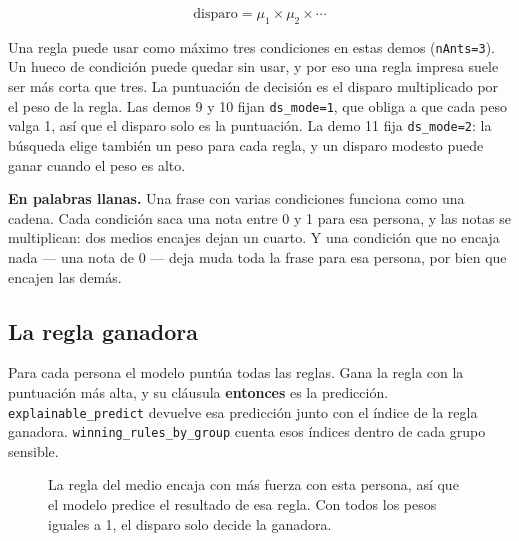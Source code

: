 \documentclass[11pt]{article}
\newcommand{\fn}[1]{\texttt{\small #1}}
\begin{document}
\[
\text{disparo} = \mu_1 \times \mu_2 \times \cdots
\]

Una regla puede usar como máximo tres condiciones en estas demos (\fn{nAnts=3}). Un hueco de condición puede quedar sin usar, y por eso una regla impresa suele ser más corta que tres. La puntuación de decisión es el disparo multiplicado por el peso de la regla. Las demos 9 y 10 fijan \fn{ds\_mode=1}, que obliga a que cada peso valga 1, así que el disparo solo es la puntuación. La demo 11 fija \fn{ds\_mode=2}: la búsqueda elige también un peso para cada regla, y un disparo modesto puede ganar cuando el peso es alto.

\begin{plainwords}
\textbf{En palabras llanas.} Una frase con varias condiciones funciona como una cadena. Cada condición saca una nota entre 0 y 1 para esa persona, y las notas se multiplican: dos medios encajes dejan un cuarto. Y una condición que no encaja nada --- una nota de 0 --- deja muda toda la frase para esa persona, por bien que encajen las demás.
\end{plainwords}

\subsection{La regla ganadora}

Para cada persona el modelo puntúa todas las reglas. Gana la regla con la puntuación más alta, y su cláusula \textbf{entonces} es la predicción. \fn{explainable\_predict} devuelve esa predicción junto con el índice de la regla ganadora. \fn{winning\_rules\_by\_group} cuenta esos índices dentro de cada grupo sensible.

\begin{figure}[H]
\centering
{}
\caption{La regla del medio encaja con más fuerza con esta persona, así que el modelo predice el resultado de esa regla. Con todos los pesos iguales a 1, el disparo solo decide la ganadora.}
\end{figure}
\end{document}
